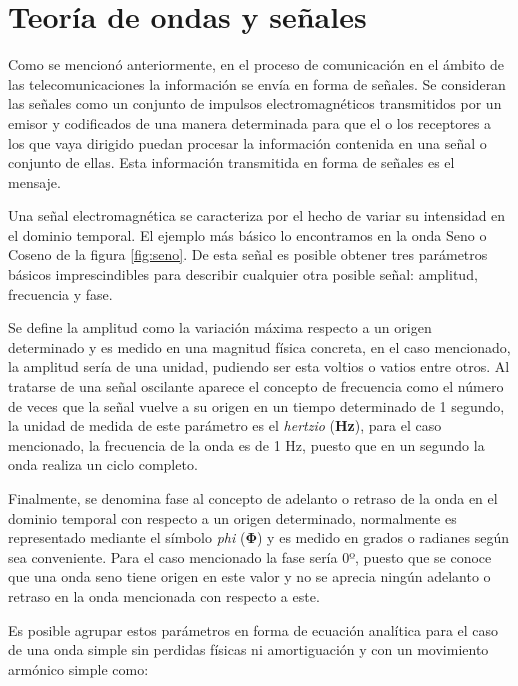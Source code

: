 \section{Teoría de ondas y señales}
\par Como se mencionó anteriormente, en el proceso de comunicación en el ámbito de las telecomunicaciones la información se envía en forma de señales. Se consideran las señales como un conjunto de impulsos electromagnéticos transmitidos por un emisor y codificados de una manera determinada para que el o los receptores a los que vaya dirigido puedan procesar la información contenida en una señal o conjunto de ellas. Esta información transmitida en forma de señales es el mensaje.
\\
\par Una señal electromagnética se caracteriza por el hecho de variar su intensidad en el dominio temporal. El ejemplo más básico lo encontramos en la onda Seno o Coseno de la figura
\ref{fig:seno}. De esta señal es posible obtener tres parámetros básicos imprescindibles para describir cualquier otra posible señal: amplitud, frecuencia y fase. 
\\
\par Se define la amplitud como la variación máxima respecto a un origen determinado y es medido en una magnitud física concreta, en el caso mencionado, la amplitud sería de una unidad, pudiendo ser esta voltios o vatios entre otros. Al tratarse de una señal oscilante aparece el concepto de frecuencia como el número de veces que la señal vuelve a su origen en un tiempo determinado de 1 segundo, la unidad de medida de este parámetro es el \textit{hertzio} (\textbf{Hz}), para el caso mencionado, la frecuencia de la onda es de 1 Hz, puesto que en un segundo la onda realiza un ciclo completo. 
\\
\par Finalmente, se denomina fase al concepto de adelanto o retraso de la onda en el dominio temporal con respecto a un origen determinado, normalmente es representado mediante el símbolo \textit{phi} (\textbf{Φ}) y es medido en grados o radianes según sea conveniente. Para el caso mencionado la fase sería 0º, puesto que se conoce que una onda seno tiene origen en este valor y no se aprecia ningún adelanto o retraso en la onda mencionada con respecto a este. 
\\
\par Es posible agrupar estos parámetros en forma de ecuación analítica para el caso de una onda simple sin perdidas físicas ni amortiguación y con un movimiento armónico simple como:

